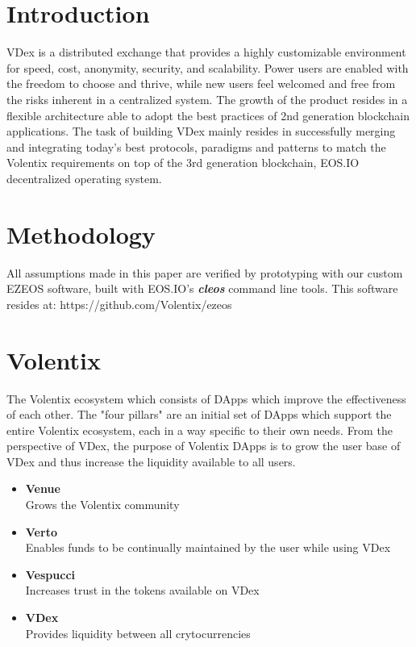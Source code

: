 \documentclass[]{article}
\begin{document}
\section{Introduction}

VDex is a distributed exchange that provides a highly customizable environment for speed, cost, anonymity, security, and scalability. 
Power users are enabled with the freedom to choose and thrive, 
while new users feel welcomed and free from the risks inherent in a centralized system. 
The growth of the product resides in a flexible architecture 
able to adopt the best practices of 2nd generation blockchain applications.  
The task of building VDex mainly resides in successfully merging
and integrating today's best protocols, paradigms and patterns to match the 
Volentix requirements on top of the 3rd generation blockchain, EOS.IO decentralized operating system.

 	
\section{Methodology}

All assumptions made in this paper are verified by prototyping with our custom EZEOS software, built
with EOS.IO's \textbf{\textit{cleos}} command line tools. This software resides at: https://github.com/Volentix/ezeos

\section{Volentix}	
The Volentix ecosystem which consists of DApps which improve the effectiveness of each other.
The "four pillars" are an initial set of DApps which support the entire Volentix ecosystem,
each in a way specific to their own needs.
From the perspective of VDex, the purpose of Volentix DApps is to grow the user base of VDex
and thus increase the liquidity available to all users.\\
\begin{itemize}
\item \textbf{Venue}\\ Grows the Volentix community
\item \textbf{Verto}\\ Enables funds to be continually maintained by the user while using VDex
\item \textbf{Vespucci}\\ Increases trust in the tokens available on VDex
\item \textbf{VDex}\\ Provides liquidity between all crytocurrencies
\end{itemize}
\end{document}
